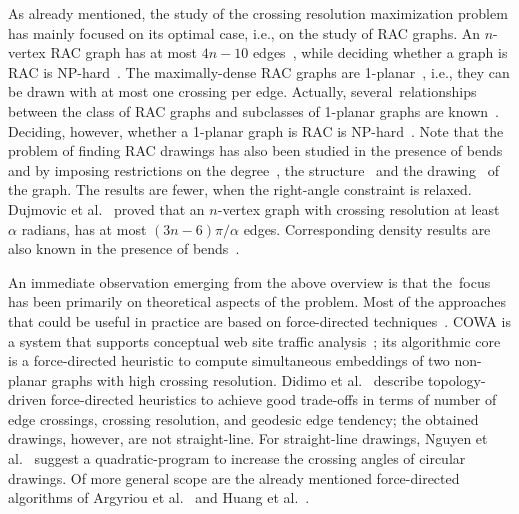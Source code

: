 \documentclass[runningheads]{llncs}
\begin{document}
As already mentioned, the study of the crossing resolution maximization problem has mainly focused on its optimal case, i.e., on the study of RAC graphs. An $n$-vertex RAC graph has at most $4n-10$ edges~\cite{DBLP:journals/tcs/DidimoEL11}, while deciding whether a graph is RAC is NP-hard~\cite{DBLP:journals/jgaa/ArgyriouBS12}. The maximally-dense RAC graphs are 1-planar~\cite{DBLP:journals/dam/EadesL13}, i.e., they can be drawn with at most one crossing per edge. Actually, several~relationships between the class of RAC graphs and subclasses of 1-planar graphs are known~\cite{DBLP:journals/dam/BachmaierBHNR17,DBLP:journals/tcs/BrandenburgDEKL16}. Deciding, however, whether a 1-planar graph is RAC is NP-hard~\cite{DBLP:journals/tcs/BekosDLMM17}. Note that the problem of finding RAC drawings has also been studied in the presence of bends~\cite{DBLP:journals/jgaa/AngeliniCDFBKS11,DBLP:journals/comgeo/ArikushiFKMT12,DBLP:journals/tcs/DidimoEL11,DBLP:journals/mst/GiacomoDLM11} and by imposing restrictions on the degree~\cite{DBLP:conf/s-egc/AngeliniBDFHKLL11}, the structure~\cite{DBLP:journals/ipl/DidimoEL10} and the drawing~\cite{DBLP:journals/algorithmica/GiacomoDEL14,DBLP:conf/wg/HongN15} of the graph. The results are fewer, when the right-angle constraint is relaxed. Dujmovic et al.~\cite{DBLP:journals/cjtcs/DujmovicGMW11} proved that an $n$-vertex graph with crossing resolution at least $\alpha$ radians, has at most $(3n-6)\pi/\alpha$ edges. Corresponding density results are also known in the presence of bends~\cite{DBLP:journals/siamdm/AckermanFT12,DBLP:journals/mst/GiacomoDLM11}.

An immediate observation emerging from the above overview is that the~focus has been primarily on theoretical aspects of the problem. Most of the approaches that could be useful in practice are based on force-directed techniques~\cite{DBLP:books/ph/BattistaETT99,DBLP:journals/congnum/Eades84}. COWA is a system that supports conceptual web site traffic analysis~\cite{DBLP:conf/apvis/DidimoLR10}; its algorithmic core is a force-directed heuristic to compute simultaneous embeddings of two non-planar graphs with high crossing resolution.
%
Didimo et al.~\cite{DBLP:conf/gd/DidimoLR10} describe topology-driven force-directed heuristics to achieve good trade-offs in terms of number of edge crossings, crossing resolution, and geodesic edge tendency; the obtained drawings, however, are not straight-line.
%
For straight-line drawings, Nguyen et al.~\cite{DBLP:conf/gd/NguyenEHH10} suggest a quadratic-program to increase the crossing angles of circular drawings.
%
Of more general scope are the already mentioned force-directed algorithms of Argyriou et al.~\cite{DBLP:journals/cj/ArgyriouBS13} and Huang et al.~\cite{DBLP:journals/vlc/HuangEHL13}.
\end{document}
